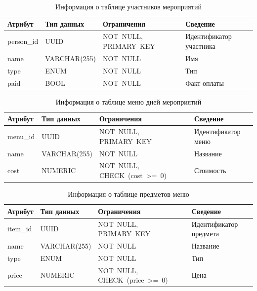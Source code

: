 \begin{table}[h!]
	\centering
	\caption{Информация о таблице участников мероприятий}
	\begin{tabularx}{\textwidth}{|p{2.6cm}|X|p{6cm}|X|}
		\hline
		\textbf{Атрибут} & \textbf{Тип данных} & \textbf{Ограничения} & \textbf{Сведение} \\
		\hline
		person\_id & UUID & NOT~NULL, \newline PRIMARY~KEY & Идентификатор участника \\
		\hline
		name & VARCHAR(255) & NOT~NULL & Имя \\
		\hline
		type & ENUM & NOT~NULL & Тип \\
		\hline
		paid & BOOL & NOT~NULL & Факт оплаты \\
		\hline
	\end{tabularx}
	\label{tbl:persons}
\end{table}

\begin{table}[h!]
	\centering
	\caption{Информация о таблице меню дней мероприятий}
	\begin{tabularx}{\textwidth}{|p{2.6cm}|X|p{6cm}|X|}
		\hline
		\textbf{Атрибут} & \textbf{Тип данных} & \textbf{Ограничения} & \textbf{Сведение} \\
		\hline
		menu\_id & UUID & NOT~NULL, \newline PRIMARY~KEY & Идентификатор меню \\
		\hline
		name & VARCHAR(255) & NOT~NULL & Название \\
		\hline
		cost & NUMERIC & NOT~NULL, \newline CHECK~(cost~>=~0) & Стоимость \\
		\hline
	\end{tabularx}
	\label{tbl:menu}
\end{table}

\begin{table}[h!]
	\centering
	\caption{Информация о таблице предметов меню}
	\begin{tabularx}{\textwidth}{|p{2.6cm}|X|p{6cm}|X|}
		\hline
		\textbf{Атрибут} & \textbf{Тип данных} & \textbf{Ограничения} & \textbf{Сведение} \\
		\hline
		item\_id & UUID & NOT~NULL, \newline PRIMARY~KEY & Идентификатор предмета \\
		\hline
		name & VARCHAR(255) & NOT~NULL & Название \\
		\hline
		type & ENUM & NOT~NULL & Тип \\
		\hline
		price & NUMERIC & NOT~NULL, \newline CHECK~(price~>=~0) & Цена \\
		\hline
	\end{tabularx}
	\label{tbl:items}
\end{table}


